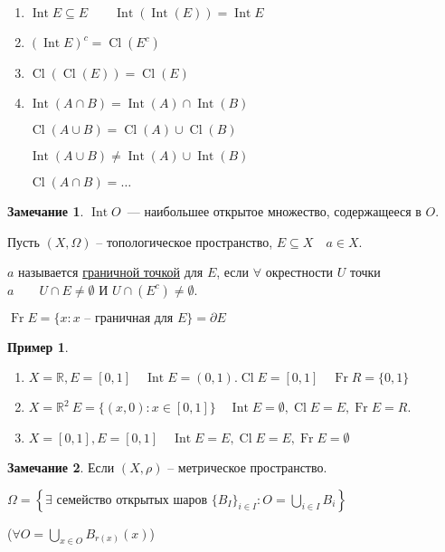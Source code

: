 \documentclass{book}
\newcommand\R{\ensuremath{\mathbb{R}}}
\renewcommand\O{\ensuremath{\emptyset}}
\DeclareMathOperator{\Cl}{Cl}
\DeclareMathOperator{\Int}{Int}
\DeclareMathOperator{\Fr}{Fr}
\theoremstyle{definition}
\newtheorem*{note}{Замечание}
\newtheorem*{example}{Пример}
\begin{document}
    \begin{problem}
        \begin{enumerate}
            \item $\Int E\subseteq E\qquad \Int(\Int(E)) = \Int E$
            \item $(\Int E)^c = \Cl(E^c)$
            \item  $\Cl(\Cl(E)) = \Cl(E)$
            \item  $\Int(A\cap B) = \Int(A)\cap \Int(B)$
            
                $\Cl(A\cup B) = \Cl(A)\cup \Cl(B)$ 
                
                $\Int(A\cup B)\neq \Int(A) \cup \Int(B)$ 
    
                $\Cl(A\cap B) = \ldots$
        \end{enumerate}
    \end{problem}
    
    \begin{note}
        $\Int O$~--- наибольшее открытое множество, содержащееся в $O$.
    \end{note}
    
    \begin{definition}
        Пусть $(X, \Omega)$ -- топологическое пространство, $E\subseteq X\quad a\in X$.
    
        $a$ называется \underline{граничной точкой} для  $E$, если  $\forall $ окрестности $U$ точки  $a\qquad U\cap E\neq \O $ И $U\cap (E^c)\neq \O $.
    
        $\Fr E = \{x: x\text{ -- граничная для } E\} = \partial E$
    \end{definition}
    
    \begin{example}
        \begin{enumerate}
            \item $X = \R, E = [0,1]\quad \Int E = (0,1). \Cl E = [0,1]\quad \Fr R = \{0, 1\}$
            \item $X = \R^2\ E = \{(x,0): x\in [0,1]\}\quad \Int E = \O , \Cl E = E, \Fr E = R$.
            \item $ X = [0,1], E = [0,1]\quad \Int E = E, \Cl E = E, \Fr E = \O $
        \end{enumerate}
    \end{example}


\begin{note}
    Если $(X, \rho)$ -- метрическое пространство.

    $\Omega = \left\{ \exists \text{ семейство открытых шаров } \{B_I\}_{i\in I}: O = \bigcup\limits_{i \in  I}  B_i \right\} $

    ($\forall O = \bigcup\limits_{x\in O} B_{r(x)}(x)$)
\end{note}
\end{document}
